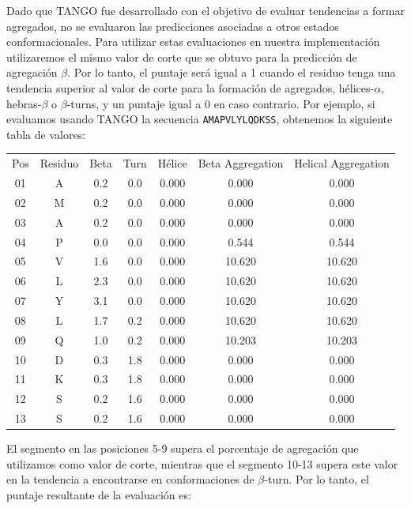 Dado que TANGO fue desarrollado con el objetivo de evaluar tendencias a formar agregados, no se evaluaron las predicciones asociadas a otros estados conformacionales. 
Para utilizar estas evaluaciones en nuestra implementación utilizaremos el mismo valor de corte que se obtuvo para la predicción de agregación $\beta$. 
Por lo tanto, el puntaje será igual a 1 cuando el residuo tenga una tendencia superior al valor de corte para la formación de agregados, hélices-$\alpha$, hebras-$\beta$ o $\beta$-turns, 
y un puntaje igual a 0 en caso contrario.
Por ejemplo, si evaluamos usando TANGO la secuencia \texttt{AMAPVLYLQDKSS}, obtenemos la siguiente tabla de valores:

\vspace{0.3cm}
\begin{center}
\begin{tabular}{ccccccc}
Pos & Residuo & Beta & Turn & 	Hélice & Beta Aggregation & Helical Aggregation\\
01 &          A & 0.2 & 0.0 &  0.000  & 0.000 &  0.000\\
02 &          M  &     0.2 &    0.0 &  0.000 &  0.000 &  0.000\\
03 &          A &      0.2  &      0.0 &  0.000 &  0.000  & 0.000\\
04  &         P &      0.0   &     0.0 &  0.000 &  0.544  & 0.544\\
05  &         V &      1.6   &     0.0 &  0.000 &  10.620 & 10.620\\
06   &        L &      2.3   &     0.0 &  0.000 &  10.620 & 10.620\\
07      &     Y &      3.1   &     0.0 &  0.000 &  10.620 & 10.620\\
08        &   L &      1.7   &     0.2 &  0.000 &  10.620 & 10.620\\
09         &  Q &      1.0   &     0.2 &  0.000 &  10.203 & 10.203\\
10   &        D &      0.3    &    1.8 &  0.000 &  0.000 &  0.000\\
11  &         K &      0.3   &     1.8 &  0.000 &  0.000 &  0.000\\
12  &         S &      0.2   &     1.6 &  0.000 &  0.000 &  0.000\\
13  &         S  &     0.2  &      1.6 &  0.000 &  0.000 &  0.000\\
\end{tabular}
\end{center}

\vspace{0.5cm}
El segmento en las posiciones 5-9 supera el porcentaje de agregación que utilizamos como valor de corte, mientras que el segmento 10-13 supera este valor en la tendencia a encontrarse en conformaciones de $\beta$-turn.
Por lo tanto, el puntaje resultante de la evaluación es:

